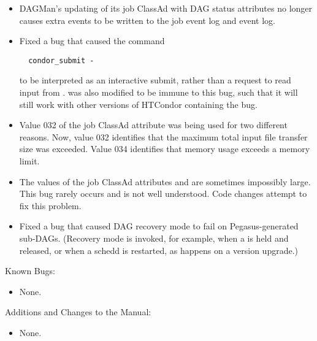 \begin{itemize}
\item DAGMan's updating of its job ClassAd with DAG status attributes no
longer causes extra events to be written to the job event log and event log.

\item Fixed a bug that caused the command
\begin{verbatim}
  condor_submit -
\end{verbatim}
to be interpreted as an interactive submit,
rather than a request to read input from .
 was also modified to be immune to this bug,
such that it will still work with other versions of HTCondor containing
the bug.

\item Value 032 of the job ClassAd attribute 
was being used for two different reasons.
Now, value 032 identifies that the maximum total input file 
transfer size was exceeded. 
Value 034 identifies that memory usage exceeds a memory limit.

\item The values of the job ClassAd attributes  
and  are sometimes impossibly large.
This bug rarely occurs and is not well understood.
Code changes attempt to fix this problem.

\item Fixed a bug that caused DAG recovery mode to fail on
Pegasus-generated sub-DAGs.  (Recovery mode is invoked, for example,
when a  is held and released, or when a schedd is
restarted, as happens on a version upgrade.)

\end{itemize}

\noindent Known Bugs:

\begin{itemize}

\item None.

\end{itemize}

\noindent Additions and Changes to the Manual:

\begin{itemize}

\item None.

\end{itemize}


